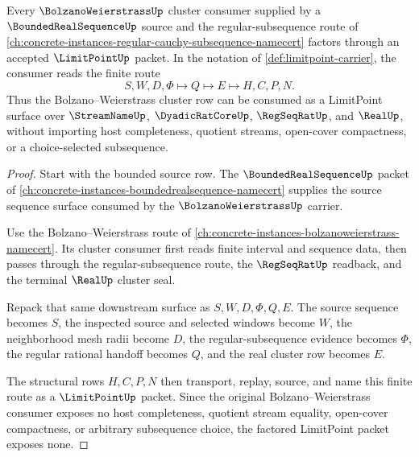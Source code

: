 \begin{theorem}
\label{thm:limitpoint-bolzano-weierstrass-handoff}
Every $\BolzanoWeierstrassUp$ cluster consumer supplied by a $\BoundedRealSequenceUp$ source and the regular-subsequence route of \autoref{ch:concrete-instances-regular-cauchy-subsequence-namecert} factors through an accepted $\LimitPointUp$ packet. In the notation of \autoref{def:limitpoint-carrier}, the consumer reads the finite route
$$
S,W,D,\Phi \longmapsto Q \longmapsto E \longmapsto H,C,P,N .
$$
Thus the Bolzano--Weierstrass cluster row can be consumed as a LimitPoint surface over $\StreamNameUp$, $\DyadicRatCoreUp$, $\RegSeqRatUp$, and $\RealUp$, without importing host completeness, quotient streams, open-cover compactness, or a choice-selected subsequence.
\end{theorem}
\begin{proof}
Start with the bounded source row. The $\BoundedRealSequenceUp$ packet of \autoref{ch:concrete-instances-boundedrealsequence-namecert} supplies the source sequence surface consumed by the $\BolzanoWeierstrassUp$ carrier.

Use the Bolzano--Weierstrass route of \autoref{ch:concrete-instances-bolzanoweierstrass-namecert}. Its cluster consumer first reads finite interval and sequence data, then passes through the regular-subsequence route, the $\RegSeqRatUp$ readback, and the terminal $\RealUp$ cluster seal.

Repack that same downstream surface as $S,W,D,\Phi,Q,E$. The source sequence becomes $S$, the inspected source and selected windows become $W$, the neighborhood mesh radii become $D$, the regular-subsequence evidence becomes $\Phi$, the regular rational handoff becomes $Q$, and the real cluster row becomes $E$.

The structural rows $H,C,P,N$ then transport, replay, source, and name this finite route as a $\LimitPointUp$ packet. Since the original Bolzano--Weierstrass consumer exposes no host completeness, quotient stream equality, open-cover compactness, or arbitrary subsequence choice, the factored LimitPoint packet exposes none.
\end{proof}


